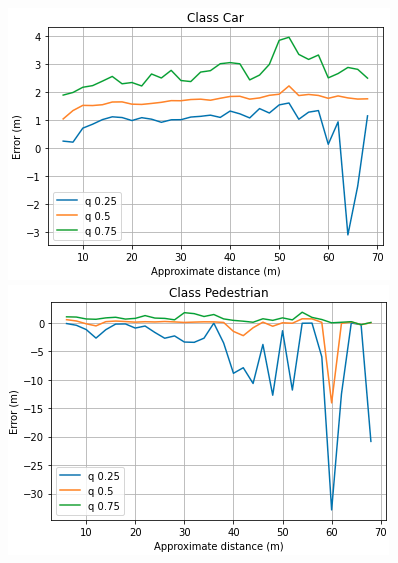 \begin{figure}[H]
	\begin{minipage}{0.32\textwidth}
		\centering
		\includegraphics[width=1\linewidth]{Book/figures/6_approx_distancia/error_projection_car_kitti3.png}
	\end{minipage}\hfill
	\begin{minipage}{0.32\textwidth}
		\centering
		\includegraphics[width=1\linewidth]{Book/figures/6_approx_distancia/error_projection_pedestrian_kitti3.png}
	\end{minipage}\hfill
	\begin{minipage}{0.32\textwidth}
		\centering

\end{minipage}
\end{figure}
